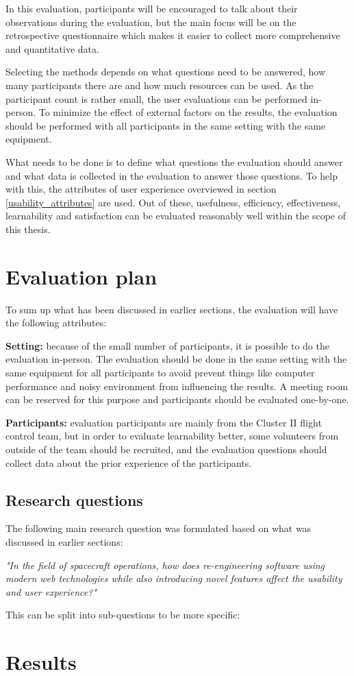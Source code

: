 In this evaluation, participants will be encouraged to talk about their observations during the evaluation, but the main focus will be on the retrospective questionnaire which makes it easier to collect more comprehensive and quantitative data.

Selecting the methods depends on what questions need to be answered, how many participants there are and how much resources can be used. As the participant count is rather small, the user evaluations can be performed in-person. To minimize the effect of external factors on the results, the evaluation should be performed with all participants in the same setting with the same equipment.

What needs to be done is to define what questions the evaluation should answer and what data is collected in the evaluation to answer those questions. To help with this, the attributes of user experience overviewed in section \ref{usability_attributes} are used. Out of these, usefulness, efficiency, effectiveness, learnability and satisfaction can be evaluated reasonably well within the scope of this thesis.

\section{Evaluation plan}
To sum up what has been discussed in earlier sections, the evaluation will have the following attributes:

\textbf{Setting:} because of the small number of participants, it is possible to do the evaluation in-person. The evaluation should be done in the same setting with the same equipment for all participants to avoid prevent things like computer performance and noisy environment from influencing the results. A meeting room can be reserved for this purpose and participants should be evaluated one-by-one.

\textbf{Participants:} evaluation participants are mainly from the Cluster II flight control team, but in order to evaluate learnability better, some volunteers from outside of the team should be recruited, and the evaluation questions should collect data about the prior experience of the participants.

\subsection{Research questions}
The following main research question was formulated based on what was discussed in earlier sections:

\textit{"In the field of spacecraft operations, how does re-engineering software using modern web technologies while also introducing novel features affect the usability and user experience?"}

This can be split into sub-questions to be more specific:

\cite{laugwitz2008construction, bevanevaluation, rubin2008handbook, albert2013measuring}

\section{Results}
